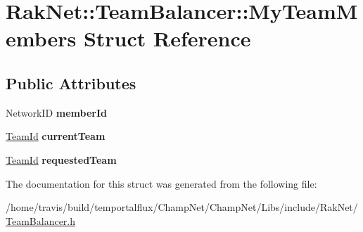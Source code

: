 \hypertarget{struct_rak_net_1_1_team_balancer_1_1_my_team_members}{\section{Rak\-Net\-:\-:Team\-Balancer\-:\-:My\-Team\-Members Struct Reference}
\label{struct_rak_net_1_1_team_balancer_1_1_my_team_members}
}
\subsection*{Public Attributes}
\begin{DoxyCompactItemize}
\item 
\hypertarget{struct_rak_net_1_1_team_balancer_1_1_my_team_members_a67e874cbef853aec765ed9b0c4f3bc30}{Network\-I\-D {\bfseries member\-Id}}\label{struct_rak_net_1_1_team_balancer_1_1_my_team_members_a67e874cbef853aec765ed9b0c4f3bc30}

\item 
\hypertarget{struct_rak_net_1_1_team_balancer_1_1_my_team_members_a60e0bfcab2f06704cb7f4a39941471e2}{\hyperlink{group___t_e_a_m___b_a_l_a_n_c_e_r___g_r_o_u_p_ga79c7825649955f28135498fb3d9f6894}{Team\-Id} {\bfseries current\-Team}}\label{struct_rak_net_1_1_team_balancer_1_1_my_team_members_a60e0bfcab2f06704cb7f4a39941471e2}

\item 
\hypertarget{struct_rak_net_1_1_team_balancer_1_1_my_team_members_a7b6ad0a4aa8d2701daf646477dd13149}{\hyperlink{group___t_e_a_m___b_a_l_a_n_c_e_r___g_r_o_u_p_ga79c7825649955f28135498fb3d9f6894}{Team\-Id} {\bfseries requested\-Team}}\label{struct_rak_net_1_1_team_balancer_1_1_my_team_members_a7b6ad0a4aa8d2701daf646477dd13149}

\end{DoxyCompactItemize}


The documentation for this struct was generated from the following file\-:\begin{DoxyCompactItemize}
\item 
/home/travis/build/temportalflux/\-Champ\-Net/\-Champ\-Net/\-Libs/include/\-Rak\-Net/\hyperlink{_team_balancer_8h}{Team\-Balancer.\-h}\end{DoxyCompactItemize}
